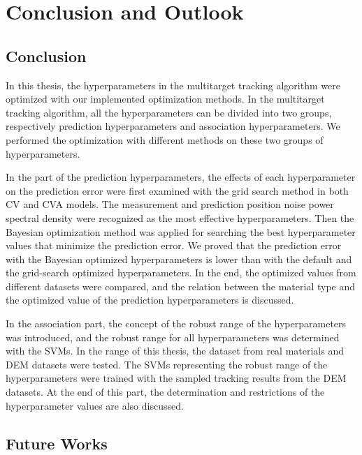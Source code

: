 \chapter{Conclusion and Outlook}

\section{Conclusion}

In this thesis, the hyperparameters in the multitarget tracking algorithm were optimized with our implemented optimization methods. In the multitarget tracking algorithm, all the hyperparameters can be divided into two groups, respectively prediction hyperparameters and association hyperparameters. We performed the optimization with different methods on these two groups of hyperparameters.

In the part of the prediction hyperparameters, the effects of each hyperparameter on the prediction error were first examined with the grid search method in both CV and CVA models. The measurement and prediction position noise power spectral density were recognized as the most effective hyperparameters. Then the Bayesian optimization method was applied for searching the best hyperparameter values that minimize the prediction error. We proved that the prediction error with the Bayesian optimized hyperparameters is lower than with the default and the grid-search optimized hyperparameters. In the end, the optimized values from different datasets were compared, and the relation between the material type and the optimized value of the prediction hyperparameters is discussed.

In the association part, the concept of the robust range of the hyperparameters was introduced, and the robust range for all hyperparameters was determined with the SVMs. In the range of this thesis, the dataset from real materials and DEM datasets were tested. The SVMs representing the robust range of the hyperparameters were trained with the sampled tracking results from the DEM datasets. At the end of this part, the determination and restrictions of the hyperparameter values are also discussed.



\section{Future Works}

